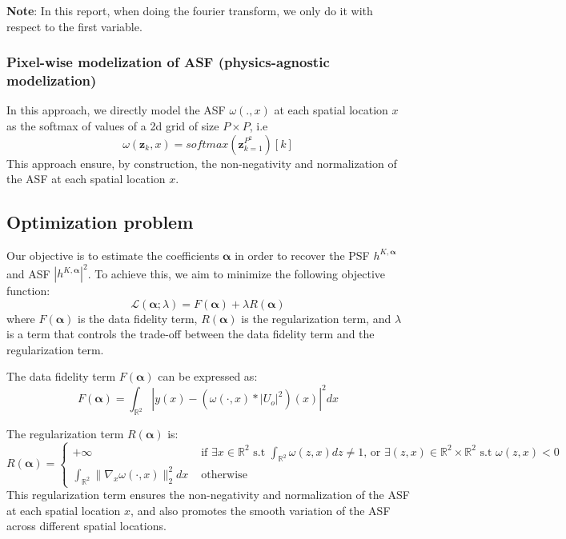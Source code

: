 \documentclass{article}
\begin{document}
\textbf{Note}: In this report, when doing the fourier transform, we only do it with respect to the first variable.

\subsubsection{Pixel-wise modelization of ASF (physics-agnostic modelization)}
In this approach, we directly model the ASF $\omega(.,x)$ at each spatial location $x$ as the softmax of values of a 2d grid of size $P \times P$, i.e
\begin{equation}
    \omega(\boldsymbol{z}_k, x) = softmax(\boldsymbol{z}_{k=1}^{P^2})[k] 
\end{equation}
This approach ensure, by construction, the non-negativity and normalization of the ASF at each spatial location $x$. 


\subsection{Optimization problem}\label{sec:optimization_problem}
Our objective is to estimate the coefficients $\boldsymbol{\alpha}$ in order to recover the PSF $h^{K, \boldsymbol{\alpha}}$ and ASF $|h^{K, \boldsymbol{\alpha}}|^2$. To achieve this, we aim to minimize the following objective function:
\begin{equation}
    \mathcal{L}(\boldsymbol{\alpha}; \lambda) = F(\boldsymbol{\alpha}) + \lambda R(\boldsymbol{\alpha})
\end{equation}
where $F(\boldsymbol{\alpha})$ is the data fidelity term, $R(\boldsymbol{\alpha})$ is the regularization term, and $\lambda$ is a term that controls the trade-off between the data fidelity term and the regularization term.

The data fidelity term $F(\boldsymbol{\alpha})$ can be expressed as:
\begin{equation}
    F(\boldsymbol{\alpha}) = \int_{\mathbb{R}^2} \left|y(x) - \left(\omega(\cdot, x) \ast |U_o|^2\right)(x)\right|^2 dx
\end{equation}


The regularization term $R(\boldsymbol{\alpha})$ is:
\begin{equation}
    R(\boldsymbol{\alpha}) = \begin{cases}
        +\infty &\mbox{ if } \exists x \in \mathbb{R}^2 \mbox{ s.t } \int_{\mathbb{R}^2} \omega(z,x) dz \neq 1 \mbox{, or } \exists (z,x) \in \mathbb{R}^2 \times \mathbb{R}^2 \mbox{ s.t } \omega(z,x) < 0 \\
        \int_{\mathbb{R}^2} \|\nabla_x \omega(\cdot, x)\|_2^2 dx & \mbox{ otherwise }
    \end{cases}
\end{equation}
This regularization term ensures the non-negativity and normalization of the ASF at each spatial location $x$, and also promotes the smooth variation of the ASF across different spatial locations.
\end{document}
